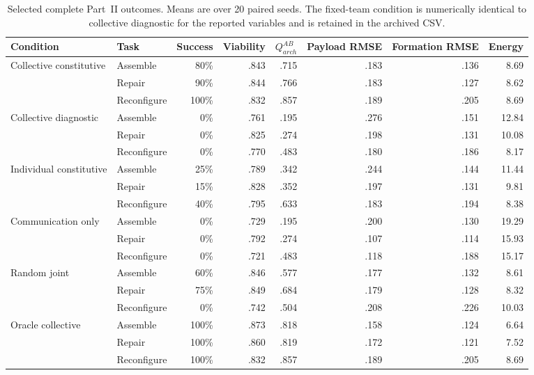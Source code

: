 \documentclass[11pt,a4paper]{article}
\numberwithin{equation}{section}
\begin{document}
\begin{table}[p]
\centering
\scriptsize
\setlength{\tabcolsep}{3.5pt}
\begin{tabular}{llrrrrrr}
\toprule
Condition & Task & Success & Viability & $Q_{arch}^{AB}$ & Payload RMSE & Formation RMSE & Energy \\
\midrule
Collective constitutive & Assemble & 80\% & .843 & .715 & .183 & .136 & 8.69 \\
 & Repair & 90\% & .844 & .766 & .183 & .127 & 8.62 \\
 & Reconfigure & 100\% & .832 & .857 & .189 & .205 & 8.69 \\
\addlinespace
Collective diagnostic & Assemble & 0\% & .761 & .195 & .276 & .151 & 12.84 \\
 & Repair & 0\% & .825 & .274 & .198 & .131 & 10.08 \\
 & Reconfigure & 0\% & .770 & .483 & .180 & .186 & 8.17 \\
\addlinespace
Individual constitutive & Assemble & 25\% & .789 & .342 & .244 & .144 & 11.44 \\
 & Repair & 15\% & .828 & .352 & .197 & .131 & 9.81 \\
 & Reconfigure & 40\% & .795 & .633 & .183 & .194 & 8.38 \\
\addlinespace
Communication only & Assemble & 0\% & .729 & .195 & .200 & .130 & 19.29 \\
 & Repair & 0\% & .792 & .274 & .107 & .114 & 15.93 \\
 & Reconfigure & 0\% & .721 & .483 & .118 & .188 & 15.17 \\
\addlinespace
Random joint & Assemble & 60\% & .846 & .577 & .177 & .132 & 8.61 \\
 & Repair & 75\% & .849 & .684 & .179 & .128 & 8.32 \\
 & Reconfigure & 0\% & .742 & .504 & .208 & .226 & 10.03 \\
\addlinespace
Oracle collective & Assemble & 100\% & .873 & .818 & .158 & .124 & 6.64 \\
 & Repair & 100\% & .860 & .819 & .172 & .121 & 7.52 \\
 & Reconfigure & 100\% & .832 & .857 & .189 & .205 & 8.69 \\
\bottomrule
\end{tabular}
\caption{Selected complete Part~II outcomes. Means are over 20 paired seeds.
The fixed-team condition is numerically identical to collective diagnostic
for the reported variables and is retained in the archived CSV.}
\label{tab:collective-results}
\end{table}
\end{document}
